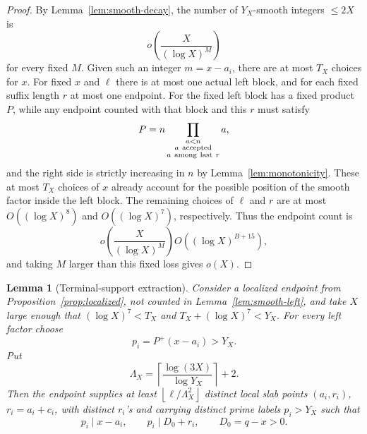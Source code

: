 \documentclass[11pt]{article}
\newtheorem{lemma}[theorem]{Lemma}
\theoremstyle{definition}
\newcommand{\pplus}{P^+}
\newcommand{\floor}[1]{\left\lfloor #1\right\rfloor}
\newcommand{\ceil}[1]{\left\lceil #1\right\rceil}
\newcommand{\1}{\mathbf 1}
\begin{document}
\begin{proof}
By Lemma~\ref{lem:smooth-decay}, the number of \(Y_X\)-smooth integers
\(\le2X\) is
\[
  o\!\left(\frac{X}{(\log X)^M}\right)
\]
for every fixed \(M\).  Given such an
integer \(m=x-a_i\), there are at most \(T_X\) choices for \(x\).  For fixed
\(x\) and \(\ell\) there is at most one actual left block, and for each
fixed suffix length \(r\) at most one endpoint.  For the fixed left block has a
fixed product \(P\), while any endpoint counted with that block and this \(r\)
must satisfy
\[
  P=n\prod_{\substack{a<n\\a\ {\rm accepted}\\a\ {\rm among\ last}\ r}}a,
\]
and the right side is strictly increasing in \(n\) by
Lemma~\ref{lem:monotonicity}.
These at most \(T_X\) choices of \(x\) already account for the possible position of
the smooth factor inside the left block.  The remaining choices of \(\ell\)
and \(r\) are at most \(O((\log X)^8)\) and \(O((\log X)^7)\), respectively.
Thus the endpoint count is
\[
  o\!\left(\frac{X}{(\log X)^M}\right)O((\log X)^{B+15}),
\]
and taking \(M\) larger than this fixed loss gives \(o(X)\).
\end{proof}

\begin{lemma}[Terminal-support extraction]\label{lem:terminal-support}
Consider a localized endpoint from Proposition~\ref{prop:localized}, not
counted in Lemma~\ref{lem:smooth-left}, and take \(X\) large enough that
\((\log X)^7<T_X\) and \(T_X+(\log X)^7<Y_X\).
For every left factor choose
\[
  p_i=\pplus(x-a_i)>Y_X.
\]
Put
\[
  \Lambda_X=\ceil{\frac{\log(3X)}{\log Y_X}}+2.
\]
Then the endpoint supplies at least \(\floor{\ell/\Lambda_X^2}\) distinct
local slab points \((a_i,r_i)\), \(r_i=a_i+c_i\), with distinct \(r_i\)'s and
carrying distinct prime labels \(p_i>Y_X\) such that
\[
  p_i\mid x-a_i,\qquad p_i\mid D_0+r_i,\qquad D_0=q-x>0.
\]
\end{lemma}
\end{document}
